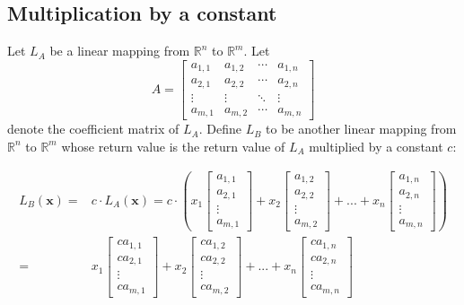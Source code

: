 \documentclass{article}
\begin{document}
\subsection*{Multiplication by a constant}

Let \(L_A\) be a linear mapping from \(\mathbb{R}^n\) to \(\mathbb{R}^m\). Let 
\[A = \begin{bmatrix} 
a_{1,1} & a_{1,2} & \cdots & a_{1,n} \\
a_{2,1} & a_{2,2} & \cdots & a_{2,n} \\
\vdots & \vdots & \ddots & \vdots \\
a_{m,1} & a_{m,2} & \cdots & a_{m,n} 
\end{bmatrix}\]
denote the coefficient matrix of \(L_A\). Define \(L_B\) to be another linear mapping from \(\mathbb{R}^n\) to \(\mathbb{R}^m\) whose return value is the return value of \(L_A\) multiplied by a constant \(c\):

\begin{align*}
L_B(\mathbf{x}) = & c \cdot L_A(\mathbf{x}) 
= c \cdot \left(x_1\begin{bmatrix} a_{1,1} \\ a_{2,1} \\ \vdots \\ a_{m,1} \end{bmatrix}
+ x_2\begin{bmatrix} a_{1,2} \\ a_{2,2} \\ \vdots \\ a_{m,2} \end{bmatrix}
+ ... + x_n\begin{bmatrix} a_{1,n} \\ a_{2,n} \\ \vdots \\ a_{m,n} \end{bmatrix}\right) \\
= & x_1\begin{bmatrix} c a_{1,1} \\ c a_{2,1} \\ \vdots \\ c a_{m,1} \end{bmatrix}
+ x_2\begin{bmatrix} c a_{1,2} \\ c a_{2,2} \\ \vdots \\ c a_{m,2} \end{bmatrix}
+ ... + x_n\begin{bmatrix} c a_{1,n} \\ c a_{2,n} \\ \vdots \\ c a_{m,n} \end{bmatrix}   
\end{align*}
\end{document}
